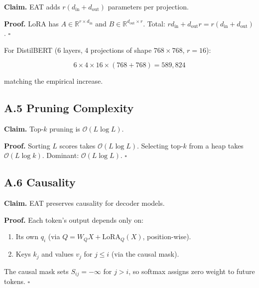 \textbf{Claim.} EAT adds $r(d_\text{in} + d_\text{out})$ parameters per projection.

\textbf{Proof.} LoRA has $A \in \mathbb{R}^{r \times d_\text{in}}$ and 
$B \in \mathbb{R}^{d_\text{out} \times r}$. Total: $r d_\text{in} + d_\text{out} r = r(d_\text{in} + d_\text{out})$. $\square$

For DistilBERT (6 layers, 4 projections of shape $768 \times 768$, $r = 16$):

\[
6 \times 4 \times 16 \times (768 + 768) = 589{,}824
\]

matching the empirical increase.

\subsection{A.5 Pruning Complexity}

\textbf{Claim.} Top-$k$ pruning is $\mathcal{O}(L \log L)$.

\textbf{Proof.} Sorting $L$ scores takes $\mathcal{O}(L \log L)$. Selecting top-$k$ 
from a heap takes $\mathcal{O}(L \log k)$. Dominant: $\mathcal{O}(L \log L)$. $\square$

\subsection{A.6 Causality}

\textbf{Claim.} EAT preserves causality for decoder models.

\textbf{Proof.} Each token's output depends only on:

\begin{enumerate}
\item Its own $q_i$ (via $Q = W_Q X + \text{LoRA}_Q(X)$, position-wise).
\item Keys $k_j$ and values $v_j$ for $j \leq i$ (via the causal mask).

\end{enumerate}
The causal mask sets $S_{ij} = -\infty$ for $j > i$, so softmax assigns zero 
weight to future tokens. $\square$

